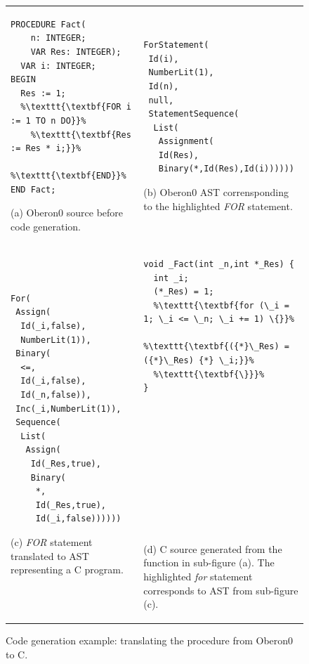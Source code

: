 %
\begin{figure}[!h]
\begin{tabular}{>{\raggedright}p{}>{\centering}p{}}

\begin{lstlisting}[basicstyle={\footnotesize\ttfamily},escapechar={\%}]
PROCEDURE Fact(
    n: INTEGER;
    VAR Res: INTEGER);
  VAR i: INTEGER;
BEGIN
  Res := 1;
  %\texttt{\textbf{FOR i := 1 TO n DO}}%
    %\texttt{\textbf{Res := Res * i;}}%
  %\texttt{\textbf{END}}%
END Fact;
\end{lstlisting}


(a) Oberon0 source before code generation. & 
\begin{lstlisting}[basicstyle={\footnotesize\ttfamily}]
ForStatement(
 Id(i),
 NumberLit(1),
 Id(n),
 null,
 StatementSequence(
  List(
   Assignment(
   Id(Res),
   Binary(*,Id(Res),Id(i))))))
\end{lstlisting}


(b) Oberon0 AST corrensponding to the highlighted \emph{FOR} statement.\tabularnewline

\begin{lstlisting}[basicstyle={\footnotesize\ttfamily}]
For(
 Assign(
  Id(_i,false),
  NumberLit(1)),
 Binary(
  <=,
  Id(_i,false),
  Id(_n,false)),
 Inc(_i,NumberLit(1)),
 Sequence(
  List(
   Assign(
    Id(_Res,true),
    Binary(
     *,
     Id(_Res,true),
     Id(_i,false))))))
\end{lstlisting}


(c) \emph{FOR} statement translated to AST representing a C program. & 
\begin{lstlisting}[basicstyle={\footnotesize\ttfamily},escapechar={\%},showlines=true]
void _Fact(int _n,int *_Res) {
  int _i;
  (*_Res) = 1;
  %\texttt{\textbf{for (\_i = 1; \_i <= \_n; \_i += 1) \{}}%
    %\texttt{\textbf{({*}\_Res) = ({*}\_Res) {*} \_i;}}%
  %\texttt{\textbf{\}}}%
}
 
 
 
 
 
 
 
 
 
 
\end{lstlisting}


(d) C source generated from the function in sub-figure (a). The highlighted
\emph{for} statement corresponds to AST from sub-figure (c).\tabularnewline
\end{tabular}

\caption{\label{fig:code-generation}Code generation example: translating the
procedure from Oberon0 to C.}

\end{figure}



